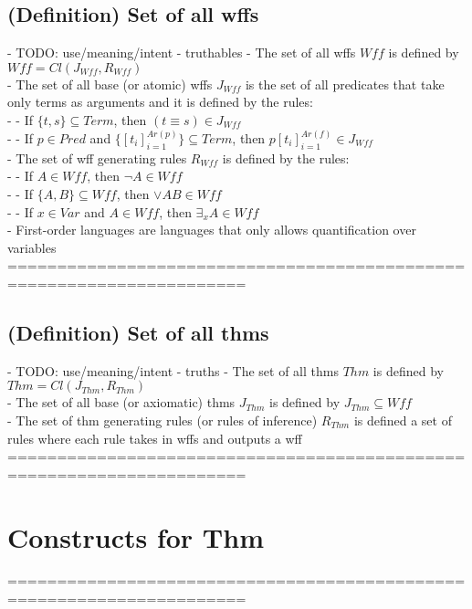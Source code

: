 \documentclass{article}
\begin{document}
\subsection{(Definition) Set of all wffs}
	- TODO: use/meaning/intent - truthables
	- The set of all wffs $Wff$ is defined by $Wff = Cl(J_{Wff}, R_{Wff})$ \\
	- The set of all base (or atomic) wffs $J_{Wff}$ is the set of all predicates that take only terms as arguments and it is defined by the rules: \\
		- - If $\{t, s\} \subseteq Term$, then $(t \equiv s) \in J_{Wff}$ \\
		- - If $p \in Pred$ and $\{[t_i]_{i=1}^{Ar(p)}\} \subseteq Term$, then $p [t_i]_{i=1}^{Ar(f)} \in J_{Wff}$ \\
	- The set of wff generating rules $R_{Wff}$ is defined by the rules: \\
		- - If $A \in Wff$, then $\lnot A \in Wff$ \\
		- - If $\{A, B\} \subseteq Wff$, then $\lor A B \in Wff$ \\
		- - If $x \in Var$ and $A \in Wff$, then $\exists_x A \in Wff$ \\
	- First-order languages are languages that only allows quantification over variables \\
	======================================================================
\subsection{(Definition) Set of all thms}
	- TODO: use/meaning/intent - truths
	- The set of all thms $Thm$ is defined by $Thm = Cl(J_{Thm}, R_{Thm})$ \\
	- The set of all base (or axiomatic) thms $J_{Thm}$ is defined by $J_{Thm} \subseteq Wff$ \\
	- The set of thm generating rules (or rules of inference) $R_{Thm}$ is defined a set of rules where each rule takes in wffs and outputs a wff \\
	======================================================================

\section{Constructs for Thm}
	======================================================================
\end{document}
